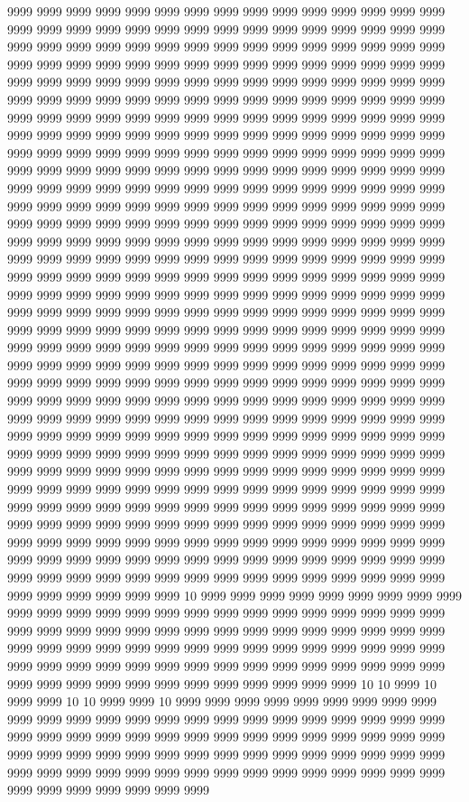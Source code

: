 9999 9999 9999 9999 9999 9999 9999 9999 9999 9999 9999 9999 9999 9999 9999 9999 9999 9999 9999 9999 9999 9999 9999 9999 9999 9999 9999 9999 9999 9999 9999 9999 9999 9999 9999 9999 9999 9999 9999 9999 9999 9999 9999 9999 9999 9999 9999 9999 9999 9999 9999 9999 9999 9999 9999 9999 9999 9999 9999 9999 9999 9999 9999 9999 9999 9999 9999 9999 9999 9999 9999 9999 9999 9999 9999 9999 9999 9999 9999 9999 9999 9999 9999 9999 9999 9999 9999 9999 9999 9999 9999 9999 9999 9999 9999 9999 9999 9999 9999 9999 9999 9999 9999 9999 9999 9999 9999 9999 9999 9999 9999 9999 9999 9999 9999 9999 9999 9999 9999 9999 9999 9999 9999 9999 9999 9999 9999 9999 9999 9999 9999 9999 9999 9999 9999 9999 9999 9999 9999 9999 9999 9999 9999 9999 9999 9999 9999 9999 9999 9999 9999 9999 9999 9999 9999 9999 9999 9999 9999 9999 9999 9999 9999 9999 9999 9999 9999 9999 9999 9999 9999 9999 9999 9999 9999 9999 9999 9999 9999 9999 9999 9999 9999 9999 9999 9999 9999 9999 9999 9999 9999 9999 9999 9999 9999 9999 9999 9999 9999 9999 9999 9999 9999 9999 9999 9999 9999 9999 9999 9999 9999 9999 9999 9999 9999 9999 9999 9999 9999 9999 9999 9999 9999 9999 9999 9999 9999 9999 9999 9999 9999 9999 9999 9999 9999 9999 9999 9999 9999 9999 9999 9999 9999 9999 9999 9999 9999 9999 9999 9999 9999 9999 9999 9999 9999 9999 9999 9999 9999 9999 9999 9999 9999 9999 9999 9999 9999 9999 9999 9999 9999 9999 9999 9999 9999 9999 9999 9999 9999 9999 9999 9999 9999 9999 9999 9999 9999 9999 9999 9999 9999 9999 9999 9999 9999 9999 9999 9999 9999 9999 9999 9999 9999 9999 9999 9999 9999 9999 9999 9999 9999 9999 9999 9999 9999 9999 9999 9999 9999 9999 9999 9999 9999 9999 9999 9999 9999 9999 9999 9999 9999 9999 9999 9999 9999 9999 9999 9999 9999 9999 9999 9999 9999 9999 9999 9999 9999 9999 9999 9999 9999 9999 9999 9999 9999 9999 9999 9999 9999 9999 9999 9999 9999 9999 9999 9999 9999 9999 9999 9999 9999 9999 9999 9999 9999 9999 9999 9999 9999 9999 9999 9999 9999 9999 9999 9999 9999 9999 9999 9999 9999 9999 9999 9999 9999 9999 9999 9999 9999 9999 9999 9999 9999 9999 9999 9999 9999 9999 9999 9999 9999 9999 9999 9999 9999 9999 9999 9999 9999 9999 9999 9999 9999 9999 9999 9999 9999 9999 9999 9999 9999 9999 9999 9999 9999 9999 9999 9999 9999 9999 9999 9999 9999 9999 9999 9999 9999 9999 9999 9999 9999 9999 9999 9999 9999 9999 9999 9999 9999 9999 9999 9999 9999 9999 9999 9999 9999 9999 9999 9999 9999 9999 9999 9999 9999 9999 9999 9999 9999 9999 9999 9999 9999 9999 9999 9999 9999 9999 9999 9999 9999 9999 9999 9999 9999 9999 9999 9999 9999 9999 9999 10 9999 9999 9999 9999 9999 9999 9999 9999 9999 9999 9999 9999 9999 9999 9999 9999 9999 9999 9999 9999 9999 9999 9999 9999 9999 9999 9999 9999 9999 9999 9999 9999 9999 9999 9999 9999 9999 9999 9999 9999 9999 9999 9999 9999 9999 9999 9999 9999 9999 9999 9999 9999 9999 9999 9999 9999 9999 9999 9999 9999 9999 9999 9999 9999 9999 9999 9999 9999 9999 9999 9999 9999 9999 9999 9999 9999 9999 9999 9999 9999 9999 10 10 9999 10 9999 9999 10 10 9999 9999 10 9999 9999 9999 9999 9999 9999 9999 9999 9999 9999 9999 9999 9999 9999 9999 9999 9999 9999 9999 9999 9999 9999 9999 9999 9999 9999 9999 9999 9999 9999 9999 9999 9999 9999 9999 9999 9999 9999 9999 9999 9999 9999 9999 9999 9999 9999 9999 9999 9999 9999 9999 9999 9999 9999 9999 9999 9999 9999 9999 9999 9999 9999 9999 9999 9999 9999 9999 9999 9999 9999 9999 9999 9999 9999 9999 9999 